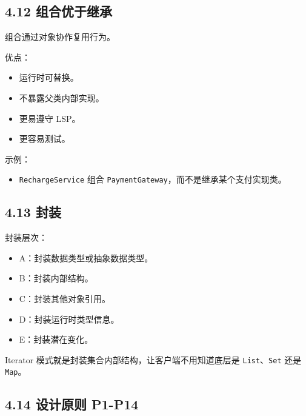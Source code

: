 \documentclass[UTF8,zihao=-4]{ctexart}
\begin{document}
\subsection{4.12 组合优于继承}

组合通过对象协作复用行为。

优点：

\begin{itemize}
\item 运行时可替换。
\item 不暴露父类内部实现。
\item 更易遵守 LSP。
\item 更容易测试。
\end{itemize}

示例：

\begin{itemize}
\item \texttt{RechargeService} 组合 \texttt{PaymentGateway}，而不是继承某个支付实现类。
\end{itemize}

\subsection{4.13 封装}

封装层次：

\begin{itemize}
\item A：封装数据类型或抽象数据类型。
\item B：封装内部结构。
\item C：封装其他对象引用。
\item D：封装运行时类型信息。
\item E：封装潜在变化。
\end{itemize}

Iterator 模式就是封装集合内部结构，让客户端不用知道底层是 \texttt{List}、\texttt{Set} 还是 \texttt{Map}。

\subsection{4.14 设计原则 P1-P14}
\end{document}
